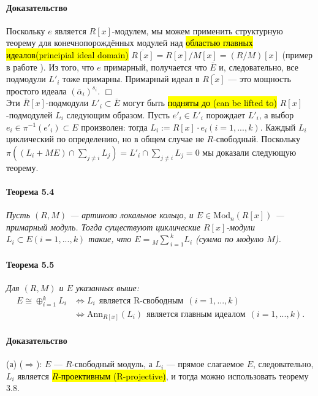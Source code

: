 \documentclass[a4paper,12pt]{article}
\newcommand{\dirsummod}[1]{{_{{#1}}\!\!\sum}}
\newcommand{\Ann}{\text{Ann}}
\newcommand{\Mod}{\text{Mod}}
\begin{document}
\paragraph{Доказательство}

Поскольку $e$ является $R[x]$-модулем, мы можем применить структурную теорему для конечнопорождённых модулей над \hl{областью главных идеалов(principial ideal domain)} $\overline{R[x]} = R[x]/M[x] = (R/M)[x]$ (пример в работе \cite{bib3}). Из того, что $e$ примарный, получается что $\overline{E}$ и, следовательно, все подмодули $L'_i$ тоже примарны. Примарный идеал в $\overline{R[x]}$ --- это мощность простого идеала $(\bar{\alpha}_i)^{s_i}$. $\Box$ \\


Эти $\bar{R}[x]$-подмодули $L'_i \subset \bar{E}$ могут быть \hl{подняты до (can be lifted to)} $R[x]$-подмодулей $L_i$ следующим образом. Пусть $e'_i \in L'_i$ порождает $L'_i$, а выбор $e_i \in \pi ^{-1} (e'_i) \subset E $ произволен: тогда $L_i := R[x] \cdot e_i (i = 1, ..., k)$. Каждый $L_i$ циклический по определению, но в общем случае не $R$-свободный. Поскольку $\pi ((L_i + M E) \cap \sum_{j \ne i}L_j) = L'_i \cap \sum_{j \ne i} L_j = 0$ мы доказали следующую теорему.

\paragraph{Теорема 5.4}
{\itshape
Пусть $(R, M)$ --- артиново локальное кольцо, и $E \in \Mod_n(R[x])$ --- примарный модуль. Тогда существуют циклические $R[x]$-модули $L_i \subset E (i = 1, ..., k)$ такие, что $E = \dirsummod{M}_{i = 1}^k L_i$ (сумма по модулю $M$).
}


\paragraph{Теорема 5.5}
{\itshape
Для $(R, M)$ и $E$ указанных выше:
$$
\begin{aligned}
E \cong \oplus_{i = 1}^{k} L_i &  \Leftrightarrow L_i ~~ \text{является R-свободным} ~~ (i = 1, ..., k) \\
&  \Leftrightarrow   \Ann_{R[x]}(L_i) ~~ \text{является главным идеалом} ~~ (i = 1, ..., k).
\end{aligned}
$$
}

\paragraph{Доказательство}
(а) ($\Rightarrow$): $E$ --- $R$-свободный модуль, а $L_i$  --- прямое слагаемое $E$, следовательно, $L_i$ является \hl{$R$-проективным (R-projective)}, и тогда можно использовать теорему 3.8.
\end{document}
